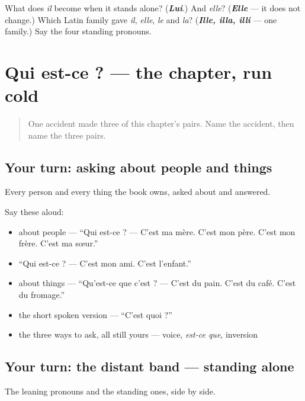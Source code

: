 \begin{tcolorbox}[breakable,colback=teal!4,colframe=teal!35!black,title={Before you move on}]
What does \emph{il} become when it stands alone? (\emph{\textbf{Lui}}.) And \emph{elle}? (\emph{\textbf{Elle}} — it does not change.) Which Latin family gave \emph{il}, \emph{elle}, \emph{le} and \emph{la}? (\emph{\textbf{Ille, illa, illi}} — one family.) Say the four standing pronouns.
\end{tcolorbox}
\section[Practice]{Qui est-ce ? — the chapter, run cold}

\label{lesson:FR-R39-qui-est-ce}



\begin{quote}
One accident made three of this chapter's pairs. Name the accident, then name the three pairs.
\end{quote}

\subsection*{Your turn: asking about people and things}
Every person and every thing the book owns, asked about and answered.

Say these aloud:

\begin{itemize}
\raggedright
  \item about people — \textquotedblleft{}Qui est-ce ? — C'est ma mère. C'est mon père. C'est mon frère. C'est ma sœur.\textquotedblright{}
  \item \textquotedblleft{}Qui est-ce ? — C'est mon ami. C'est l'enfant.\textquotedblright{}
  \item about things — \textquotedblleft{}Qu'est-ce que c'est ? — C'est du pain. C'est du café. C'est du fromage.\textquotedblright{}
  \item the short spoken version — \textquotedblleft{}C'est quoi ?\textquotedblright{}
  \item the three ways to ask, all still yours — voice, \emph{est-ce que}, inversion
\end{itemize}

\subsection*{Your turn: the distant band — standing alone}
The leaning pronouns and the standing ones, side by side.

